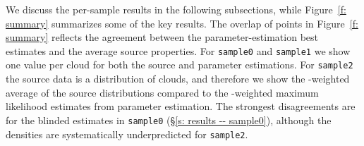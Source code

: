 \documentclass[fleqn,usenatbib]{mnras}
\begin{document}


We discuss the per-sample results in the following subsections,
while Figure~\ref{f: summary} summarizes some of the key results.
The overlap of points in Figure~\ref{f: summary} reflects the agreement between the parameter-estimation best estimates and the average source properties.
For \texttt{sample0} and \texttt{sample1} we show one value per cloud for both the source and parameter estimations.
For \texttt{sample2} the source data is a distribution of clouds, and therefore we show the -weighted average of the source distributions compared to the -weighted maximum likelihood estimates from parameter estimation.
The strongest disagreements are for the blinded estimates in \texttt{sample0} (\S\ref{s: results -- sample0}), although the densities are systematically underpredicted for \texttt{sample2}.
\end{document}
